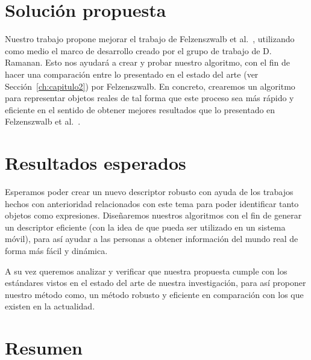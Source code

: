 \section{Solución propuesta}

Nuestro trabajo propone mejorar el trabajo de Felzenszwalb et al.~\cite{Felzenszwalb2010}, utilizando como medio el marco de desarrollo creado por el grupo de trabajo de D. Ramanan. Esto nos ayudará a crear y probar nuestro algoritmo, con el fin de hacer una comparación entre lo presentado en el estado del arte (ver Sección~\ref{ch:capitulo2}) por Felzenszwalb. En concreto, crearemos un algoritmo para representar objetos reales de tal forma que este proceso sea más rápido y eficiente en el sentido de obtener mejores resultados que lo presentado en Felzenszwalb et al.~\cite{Felzenszwalb2010}.


\section{Resultados esperados}
Esperamos poder crear un nuevo descriptor robusto con ayuda de los trabajos hechos con anterioridad relacionados con este tema para poder identificar tanto objetos como expresiones. Diseñaremos nuestros algoritmos con el fin de generar un descriptor eficiente (con la idea de que pueda ser utilizado en un sistema móvil), para así ayudar a las personas a obtener información del mundo real de forma más fácil y dinámica.

A su vez queremos analizar y verificar que nuestra propuesta cumple con los estándares vistos en el estado del arte de nuestra investigación, para así proponer nuestro método como, un método robusto y eficiente en comparación con los que existen en la actualidad.

\section{Resumen}

